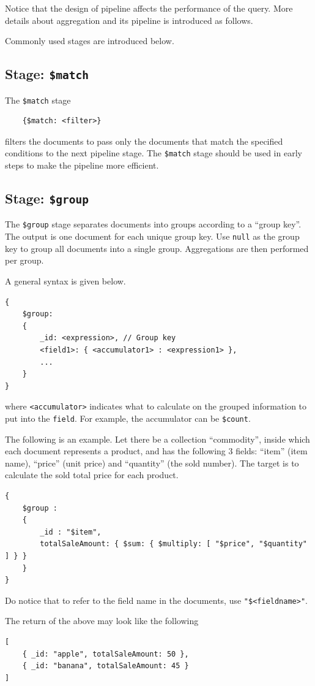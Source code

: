 Notice that the design of pipeline affects the performance of the query. More details about aggregation and its pipeline is introduced as follows.

Commonly used stages are introduced below.

\subsection{Stage: \texttt{\$match}}

The \verb|$match| stage
\begin{lstlisting}
	{$match: <filter>}
\end{lstlisting}
filters the documents to pass only the documents that match the specified conditions to the next pipeline stage. The \verb|$match| stage should be used in early steps to make the pipeline more efficient.

\subsection{Stage: \texttt{\$group}}

The \verb|$group| stage separates documents into groups according to a ``group key''. The output is one document for each unique group key. Use \verb|null| as the group key to group all documents into a single group. Aggregations are then performed per group.

A general syntax is given below.
\begin{lstlisting}
{
	$group:
	{
		_id: <expression>, // Group key
		<field1>: { <accumulator1> : <expression1> },
		...
	}
}
\end{lstlisting}
where \verb|<accumulator>| indicates what to calculate on the grouped information to put into the \verb|field|. For example, the accumulator can be \verb|$count|.

The following is an example. Let there be a collection ``commodity'', inside which each document represents a product, and has the following 3 fields: ``item'' (item name), ``price'' (unit price) and ``quantity'' (the sold number). The target is to calculate the sold total price for each product.
\begin{lstlisting}
{
	$group :
	{
		_id : "$item",
		totalSaleAmount: { $sum: { $multiply: [ "$price", "$quantity" ] } }
	}
}
\end{lstlisting}
Do notice that to refer to the field name in the documents, use \verb|"$<fieldname>"|.

The return of the above may look like the following
\begin{lstlisting}
[
	{ _id: "apple", totalSaleAmount: 50 },
	{ _id: "banana", totalSaleAmount: 45 }
]

\end{lstlisting}

